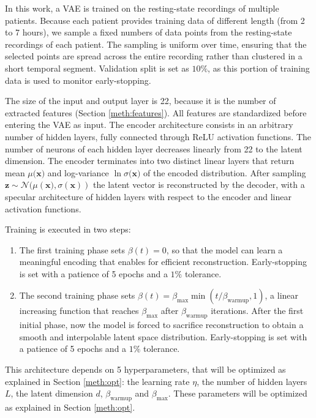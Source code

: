 In this work, a VAE is trained on the resting-state recordings of multiple
patients.
Because each patient provides training data of different length (from 2 to 7
hours), we sample a fixed numbers of data points from the resting-state
recordings of each patient.
The sampling is uniform over time, ensuring that the selected points are spread
across the entire recording rather than clustered in a short temporal segment.
Validation split is set as $10\%$, as this portion of training data is used to
monitor early-stopping.

The size of the input and output layer is 22, because it is the number of
extracted features (Section \ref{meth:features}).
All features are standardized before entering the VAE as input.
The encoder architecture consists in an arbitrary number of hidden layers,
fully connected through ReLU activation functions.
The number of neurons of each hidden layer decreases linearly from 22 to the
latent dimension.
The encoder terminates into two distinct linear layers that return mean
$\mu({\mathbf{x})}$ and log-variance $\ln\sigma({\mathbf{x})}$ of the encoded
distribution.
After sampling
$\mathbf{z}\sim\mathcal{N}(\mu({\mathbf{x})},\sigma({\mathbf{x}}))$ the latent
vector is reconstructed by the decoder, with a specular architecture of hidden
layers with respect to the encoder and linear activation functions.

Training is executed in two steps:
\begin{enumerate}
    \item The first training phase sets $\beta(t)=0$, so that the model can
    learn a meaningful encoding that enables for efficient 
    reconstruction. Early-stopping is set with a patience of 5 epochs and a
    $1\%$ tolerance.
    \item The second training phase sets
    $\beta(t)=\beta_{\text{max}}\min{(t/\beta_{\text{warmup}}, 1)}$, 
    a linear increasing function that reaches $\beta_{\text{max}}$ after 
    $\beta_{\text{warmup}}$ iterations.
    After the first initial phase, now the model is forced to sacrifice
    reconstruction to obtain a smooth and interpolable latent space
    distribution. Early-stopping is set with a patience of 5 epochs and a
    $1\%$ tolerance.
\end{enumerate}

This architecture depends on 5 hyperparameters, that will be optimized as
explained in Section \ref{meth:opt}:
the learning rate $\eta$, the number of hidden layers $L$, the latent dimension
$d$, $\beta_{\text{warmup}}$ and $\beta_{\text{max}}$.
These parameters will be optimized as explained in Section \ref{meth:opt}.


